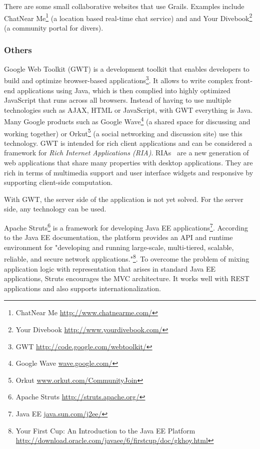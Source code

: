 There are some small collaborative websites that use Grails. Examples include ChatNear Me\footnote{ChatNear Me \url{http://www.chatnearme.com/}} (a location based real-time chat service) and and Your Divebook\footnote{Your Divebook \url{http://www.yourdivebook.com/}} (a community portal for divers). 

\subsubsection{Others}
Google Web Toolkit (GWT) is a development toolkit that enables developers to build and optimize browser-based applications\footnote{GWT \url{http://code.google.com/webtoolkit/}}.  It allows to write complex front-end applications using Java, which is then complied into highly optimized JavaScript that runs across all browsers. Instead of having to use multiple technologies such as AJAX, HTML or JavaScript, with GWT everything is Java. Many Google products such as Google Wave\footnote{Google Wave \url{wave.google.com/}} (a shared space for discussing and working together) or Orkut\footnote{Orkut \url{www.orkut.com/CommunityJoin}} (a social networking and discussion site) use this technology. GWT is intended for rich client applications and can be considered a framework for \textit{Rich Internet Applications (RIA)}. RIAs~\cite{ria} are a new generation of web applications that share many properties with desktop applications. They are rich in terms of multimedia support and user interface widgets and responsive by supporting client-side computation. 

With GWT, the server side of the application is not yet solved. For the server side, any technology can be used. 


Apache Struts\footnote{Apache Struts \url{http://struts.apache.org/}} is a framework for developing Java EE applications\footnote{Java EE \url{java.sun.com/j2ee/}}.
According to the Java EE documentation, the platform provides an API and runtime environment for "developing and running large-scale, multi-tiered, scalable, reliable, and secure network applications."\footnote{Your First Cup: An Introduction to the Java EE Platform \url{http://download.oracle.com/javaee/6/firstcup/doc/gkhoy.html}}.
To overcome the problem of mixing application logic with representation that arises in standard Java EE applications, Struts encourages the MVC architecture. It works well with REST applications and also supports internationalization. 


